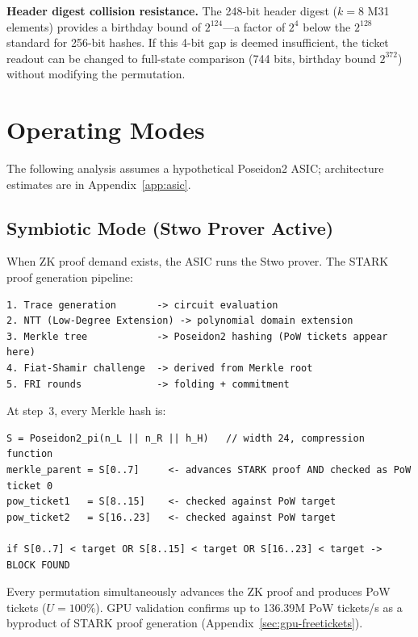\documentclass[11pt,a4paper]{article}
\begin{document}
\textbf{Header digest collision resistance.} The 248-bit header digest ($k = 8$ M31 elements) provides a birthday bound of $2^{124}$---a factor of $2^4$ below the $2^{128}$ standard for 256-bit hashes. If this 4-bit gap is deemed insufficient, the ticket readout can be changed to full-state comparison (744 bits, birthday bound $2^{372}$) without modifying the permutation.

\section{Operating Modes}
\label{sec:modes}

The following analysis assumes a hypothetical Poseidon2 ASIC; architecture estimates are in Appendix~\ref{app:asic}.

\subsection{Symbiotic Mode (Stwo Prover Active)}
\label{sec:symbiotic}

When ZK proof demand exists, the ASIC runs the Stwo prover. The STARK proof generation pipeline:

\begin{Verbatim}[fontsize=\small]
1. Trace generation       -> circuit evaluation
2. NTT (Low-Degree Extension) -> polynomial domain extension
3. Merkle tree            -> Poseidon2 hashing (PoW tickets appear here)
4. Fiat-Shamir challenge  -> derived from Merkle root
5. FRI rounds             -> folding + commitment
\end{Verbatim}

At step~3, every Merkle hash is:
\begin{Verbatim}[fontsize=\small]
S = Poseidon2_pi(n_L || n_R || h_H)   // width 24, compression function
merkle_parent = S[0..7]     <- advances STARK proof AND checked as PoW ticket 0
pow_ticket1   = S[8..15]    <- checked against PoW target
pow_ticket2   = S[16..23]   <- checked against PoW target

if S[0..7] < target OR S[8..15] < target OR S[16..23] < target -> BLOCK FOUND
\end{Verbatim}

Every permutation simultaneously advances the ZK proof and produces PoW tickets ($U = 100\%$). GPU validation confirms up to 136.39M PoW tickets/s as a byproduct of STARK proof generation (Appendix~\ref{sec:gpu-freetickets}).
\end{document}

